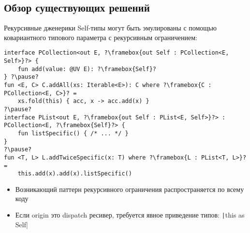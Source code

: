 \documentclass[handout,aspectratio=169,usenames,dvipsnames]{beamer}
\begin{document}
\subsection{Обзор существующих решений}

\begin{frame}[fragile]{Рекурсивные дженерики}
    Self-типы могут быть эмулированы с помощью ковариантного типового параметра с рекурсивным ограничением:
    \begin{verbatim}
interface PCollection<out E, ?\framebox{out Self : PCollection<E, Self>}?> {
    fun add(value: @UV E): ?\framebox{Self}?
} ?\pause?
fun <E, C> C.addAll(xs: Iterable<E>): C where ?\framebox{C : PCollection<E, C>}? =
    xs.fold(this) { acc, x -> acc.add(x) }
?\pause?
interface PList<out E, ?\framebox{out Self : PList<E, Self>}?> : PCollection<E, ?\framebox{Self}?> {
    fun listSpecific() { /* ... */ }
}
?\pause?
fun <T, L> L.addTwiceSpecific(x: T) where ?\framebox{L : PList<T, L>}? =
    this.add(x).add(x).listSpecific()
    \end{verbatim}
    \begin{itemize}
        \item Возникающий паттерн рекурсивного ограничения распространяется по всему коду
        \item Если origin это dispatch ресивер, требуется явное приведение типов: \texttt|this as Self|
    \end{itemize}
\end{frame}
\end{document}
